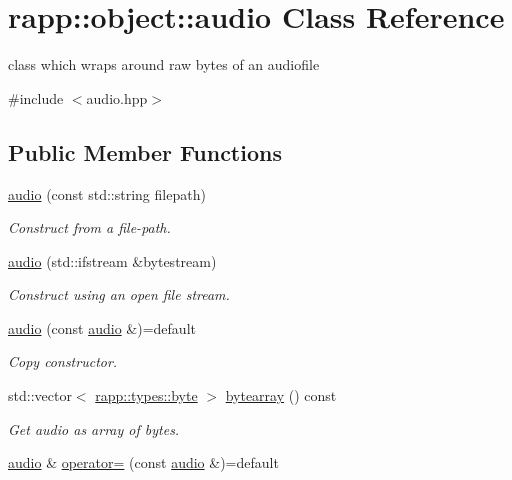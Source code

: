 \hypertarget{classrapp_1_1object_1_1audio}{\section{rapp\-:\-:object\-:\-:audio Class Reference}
\label{classrapp_1_1object_1_1audio}
}


class which wraps around raw bytes of an audiofile  




{\ttfamily \#include $<$audio.\-hpp$>$}

\subsection*{Public Member Functions}
\begin{DoxyCompactItemize}
\item 
\hyperlink{classrapp_1_1object_1_1audio_a01c7492e030076cf3f579fee73990b96}{audio} (const std\-::string filepath)
\begin{DoxyCompactList}\small\item\em Construct from a file-\/path. \end{DoxyCompactList}\item 
\hyperlink{classrapp_1_1object_1_1audio_a5f8b8dea6ffe4c30bb7af66244a3cd48}{audio} (std\-::ifstream \&bytestream)
\begin{DoxyCompactList}\small\item\em Construct using an open file stream. \end{DoxyCompactList}\item 
\hyperlink{classrapp_1_1object_1_1audio_a55ba2b7c267b6e6ad168611d7141e239}{audio} (const \hyperlink{classrapp_1_1object_1_1audio}{audio} \&)=default
\begin{DoxyCompactList}\small\item\em Copy constructor. \end{DoxyCompactList}\item 
std\-::vector$<$ \hyperlink{namespacerapp_1_1types_a1dbc9dc2ab4507d8fb58ac3a204d307b}{rapp\-::types\-::byte} $>$ \hyperlink{classrapp_1_1object_1_1audio_aa2a7060842d1c1109ef2f0962c8351d4}{bytearray} () const 
\begin{DoxyCompactList}\small\item\em Get audio as array of bytes. \end{DoxyCompactList}\item 
\hyperlink{classrapp_1_1object_1_1audio}{audio} \& \hyperlink{classrapp_1_1object_1_1audio_a24f8fec829056bc30d9ec0fe0f23cac3}{operator=} (const \hyperlink{classrapp_1_1object_1_1audio}{audio} \&)=default

\end{DoxyCompactItemize}
